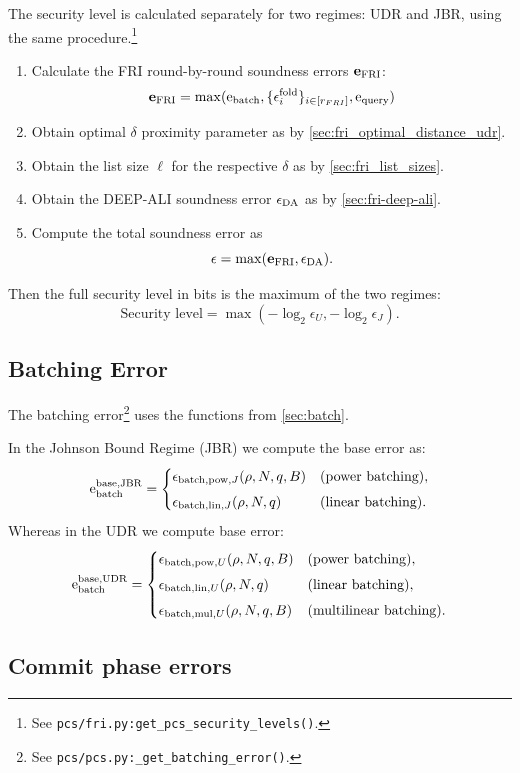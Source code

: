 The security level is calculated separately for two regimes: UDR and JBR, using the same procedure.\footnote{See \texttt{pcs/fri.py:get\_pcs\_security\_levels()}.}
\begin{enumerate}
    \item Calculate the FRI round-by-round soundness errors $\mathbf{e}_{\mathrm{FRI}} $:
    $$
    \mathbf{e}_{\mathrm{FRI}} =\max(\mathrm{e}_{\mathrm{batch}},  \{\epsilon_{i}^{\mathrm{fold}}\}_{i\in[r_{FRI}]}, \mathrm{e}_{\mathrm{query}})
     $$
    \item Obtain optimal $\delta $ proximity parameter as by   \cref{sec:fri_optimal_distance_udr}.
    \item Obtain the list size $\ell$ for the respective  $\delta $ as  by \cref{sec:fri_list_sizes}.
    \item Obtain the DEEP-ALI soundness error $\epsilon_{\mathrm{DA}}$ as by \cref{sec:fri-deep-ali}.
    \item Compute the total soundness error as
     $$
    \epsilon  = \max(\mathbf{e}_{\mathrm{FRI}}, \epsilon_{\mathrm{DA}}) .
    $$
\end{enumerate}
Then the  full security level in bits is the maximum of the two regimes:
$$
\text{Security level} = \max(-\log_2 \epsilon_U, -\log_2 \epsilon_J).
$$

\subsection{Batching Error }

The batching error\footnote{See \texttt{pcs/pcs.py:\_get\_batching\_error()}.} uses the functions from \cref{sec:batch}.

In the Johnson Bound Regime (JBR) we compute the base error as:
\[
\mathrm{e}_{\mathrm{batch}}^{\text{base,JBR}} =
\begin{cases}
   \epsilon_{\mathrm{batch,pow},J} (\rho,N,q,B) & \text{(power batching)}, \\[4pt]
  \epsilon_{\mathrm{batch,lin},J} (\rho,N,q)& \text{(linear batching)}.
\end{cases}
\]
Whereas in the UDR we compute base error:
\[
\mathrm{e}_{\mathrm{batch}}^{\text{base,UDR}}=
\begin{cases}
   \epsilon_{\mathrm{batch,pow},U} (\rho,N,q,B) & \text{(power batching)}, \\[4pt]
  \epsilon_{\mathrm{batch,lin},U} (\rho,N,q)& \text{(linear batching)}, \\[4pt]
  \epsilon_{\mathrm{batch,mul},U} (\rho,N,q,B)& \text{(multilinear batching)}.
\end{cases}
\]

\subsection{Commit phase errors}

